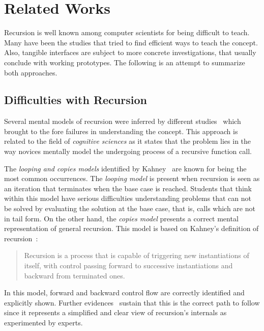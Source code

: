 
\section{Related Works}

Recursion is well known among computer scientists for being difficult
to teach. Many have been the studies that tried to find efficient ways
to teach the concept. Also, tangible interfaces are subject to more
concrete investigations, that usually conclude with working
prototypes. The following is an attempt to summarize both approaches.

\subsection{Difficulties with Recursion}

Several mental models of recursion were inferred by different
studies~\cite{SandersGalpinGotschi:2006, Mirolo:2009} which brought
to the fore failures in understanding the concept. This approach is
related to the field of \emph{cognitive sciences} as it states that
the problem lies in the way novices mentally model the undergoing
process of a recursive function call.

The \emph{looping and copies models} identified by
Kahney~\cite{Kahney:1983} are known for being the most common
occurrences. The \emph{looping model} is present when recursion is
seen as an iteration that terminates when the base case is reached.
Students that think within this model have serious difficulties
understanding problems that can not be solved by evaluating the
solution at the base case, that is, calls which are not in tail form.
On the other hand, the \emph{copies model} presents a correct mental
representation of general recursion. This model is based on Kahney's
definition of recursion~\cite{Kahney:1983}:
\begin{quote}
  Recursion is a process that is capable of triggering new
  instantiations of itself, with control passing forward to successive
  instantiations and backward from terminated ones.
\end{quote}
In this model, forward and backward control flow are correctly
identified and explicitly shown. Further
evidences~\cite{GotschiSandersGalpin:2003, SandersGalpinGotschi:2006,
  Kahney:1983, George:2000a, Wu:1993} sustain that this is the
correct path to follow since it represents a simplified and clear
view of recursion's internals as experimented by experts.

